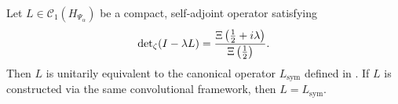 \begin{corollary}
\label{cor:canonical_operator_uniqueness}
Let \( L \in \mathcal{C}_1(H_{\Psi_\alpha}) \) be a compact, self-adjoint operator satisfying
\[
\det\nolimits_{\zeta}(I - \lambda L) = \frac{\Xi\left(\tfrac{1}{2} + i\lambda\right)}{\Xi\left(\tfrac{1}{2}\right)}.
\]
Then \( L \) is unitarily equivalent to the canonical operator \( L_{\mathrm{sym}} \) defined in . If \( L \) is constructed via the same convolutional framework, then \( L = L_{\mathrm{sym}} \).
\end{corollary}
